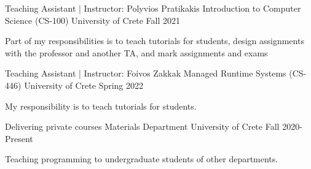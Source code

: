 


\begin{cventries}

  \cventry
    {Teaching Assistant | Instructor: Polyvios Pratikakis} %
    {Introduction to Computer Science (CS-100)} %
    {University of Crete} %
    {Fall 2021} %
    {
      \begin{cvitems} %
        \item{Part of my responsibilities is to teach tutorials for
            students, design assignments with the professor and
              another TA, and mark assignments and exams}
      \end{cvitems}
    }

  \cventry
    {Teaching Assistant | Instructor: Foivos Zakkak} %
    {Managed Runtime Systems (CS-446)} %
    {University of Crete} %
    {Spring 2022} %
    {
      \begin{cvitems} %
        \item{My responsibility is to teach tutorials for
            students.}
      \end{cvitems}
    }


  \cventry
    {Delivering private courses} %
    {Materials Department} %
    {University of Crete} %
    {Fall 2020-Present} %
    {
      \begin{cvitems}
        \item{Teaching programming to undergraduate students of other departments.}
      \end{cvitems}
    }

\end{cventries}
